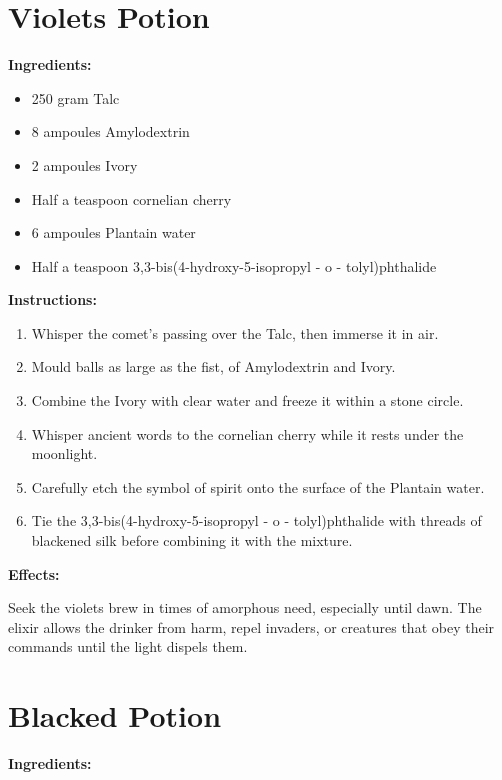 \documentclass{article}
\begin{document}
\newpage
\section*{Violets Potion}

\textbf{Ingredients:}

\begin{itemize}
  \item 250 gram Talc
  \item 8 ampoules Amylodextrin
  \item 2 ampoules Ivory
  \item Half a teaspoon cornelian cherry
  \item 6 ampoules Plantain water
  \item Half a teaspoon 3,3-bis(4-hydroxy-5-isopropyl - o - tolyl)phthalide
\end{itemize}

\textbf{Instructions:}

\begin{enumerate}
  \item Whisper the comet’s passing over the Talc, then immerse it in air.
  \item Mould balls as large as the fist, of Amylodextrin and Ivory.
  \item Combine the Ivory with clear water and freeze it within a stone circle.
  \item Whisper ancient words to the cornelian cherry while it rests under the moonlight.
  \item Carefully etch the symbol of spirit onto the surface of the Plantain water.
  \item Tie the 3,3-bis(4-hydroxy-5-isopropyl - o - tolyl)phthalide with threads of blackened silk before combining it with the mixture.
\end{enumerate}

\textbf{Effects:}

Seek the violets brew in times of amorphous need, especially until dawn. The elixir allows the drinker from harm, repel invaders, or creatures that obey their commands until the light dispels them.

\newpage
\section*{Blacked Potion}

\textbf{Ingredients:}
\end{document}
